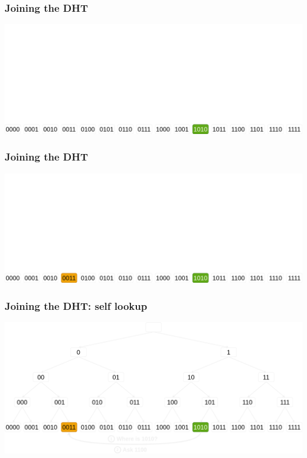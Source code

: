 \documentclass{pl-slide}
\begin{document}
\begin{frame}
\frametitle{Joining the DHT}
\begin{minipage}[b]{\linewidth}
\begin{center}
        \includegraphics[width=\linewidth,keepaspectratio]{resources/dht-insert1.png}
\end{center}
\end{minipage}
\end{frame}


\begin{frame}
\frametitle{Joining the DHT}
\begin{minipage}[b]{\linewidth}
\begin{center}
        \includegraphics[width=\linewidth,keepaspectratio]{resources/dht-insert.png}
\end{center}
\end{minipage}
\end{frame}

\begin{frame}
\frametitle{Joining the DHT: self lookup}
\begin{minipage}[b]{\linewidth}
\begin{center}
        \includegraphics[width=\linewidth,keepaspectratio]{resources//dht-self-lookup.png}
\end{center}
\end{minipage}
\end{frame}
\end{document}

